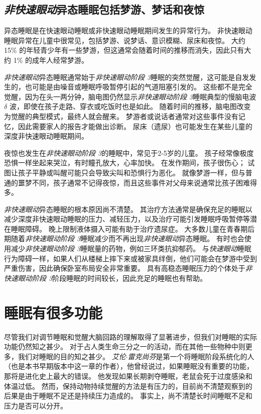\subsection{\textit{非快速眼动}异态睡眠包括梦游、梦话和夜惊}

异态睡眠是在快速眼动睡眠或非快速眼动睡眠期间发生的异常行为。
非快速眼动睡眠异常在儿童中很常见，包括梦游、说梦话、意识模糊、尿床和夜惊。
大约 15\% 的年轻青少年有一些梦游，但这通常会随着时间的推移而消失，因此只有大约 1\% 的成年人经常梦游。


\textit{非快速眼动}异态睡眠通常始于\textit{非快速眼动阶段 3}睡眠的突然觉醒，这可能是自发发生的，也可能是由噪音或睡眠呼吸暂停引起的气道阻塞引发的。
这些都不是完全觉醒，因为在头一两分钟，脑电图仍然显示\textit{非快速眼动阶段 3}睡眠典型的慢脑电波 $ \delta $ 波，即使在孩子走路、穿衣或吃饭时也是如此。
随着时间的推移，脑电图改变为觉醒的典型模式，最终人就会醒来。
梦游者或说话者通常对这些事件没有记忆，因此需要家人的报告才能做出诊断。
尿床（遗尿）也可能发生在某些儿童的深度非快速眼动睡眠期间。


夜惊也发生在\textit{非快速眼动阶段 3}的睡眠中，常见于2-5岁的儿童。
孩子经常像极度恐惧一样坐起来哭泣，有时瞳孔放大，心率加快。
在发作期间，孩子很伤心；
试图让孩子平静或叫醒可能只会导致尖叫和恐惧行为恶化。
就像梦游一样，但与普通的噩梦不同，孩子通常不记得夜惊，而且这些事件对父母来说通常比孩子困难得多。


\textit{非快速眼动}异态睡眠的根本原因尚不清楚。
其治疗方法通常是确保充足的睡眠以减少深度非快速眼动睡眠的压力、减轻压力，以及治疗可能引发睡眠呼吸暂停等潜在睡眠障碍。
晚上限制液体摄入可能有助于治疗遗尿症。
大多数儿童在青春期后期随着\textit{非快速眼动阶段 3}睡眠减少而不再出现\textit{非快速眼动}异态睡眠。
有时也会使用减少\textit{非快速眼动阶段 3}睡眠量的药物，例如三环类抗抑郁药。
与\textit{快速眼动}睡眠行为障碍一样，如果人们从楼梯上摔下来或被家具绊倒，他们可能会在梦游中受到严重伤害，因此确保卧室布局安全非常重要。
具有高稳态睡眠压力的个体处于\textit{非快速眼动阶段 3}阶段睡眠的时间较长，因此充足的睡眠也有帮助。



\section{睡眠有很多功能}

尽管我们对调节睡眠和觉醒大脑回路的理解取得了显著进步，但我们对睡眠的实际功能仍然知之甚少。
对于占人类生命三分之一的活动，而在其他一些物种中则更多，我们对睡眠的目的知之甚少。
\textit{艾伦$\cdot$雷克尚芬}是第一个将睡眠阶段系统化的人（也是本书早期版本中这一章的作者），他曾经说过，如果睡眠没有重要的功能，那将是进化史上最大的错误。
他发现如果长期剥夺睡眠，老鼠会死于过度感染和体温过低。
然而，保持动物持续觉醒的方法是有压力的，目前尚不清楚观察到的后果是由于睡眠不足还是持续压力造成的。
事实上，尚不清楚长时间睡眠不足和压力是否可以分开。


